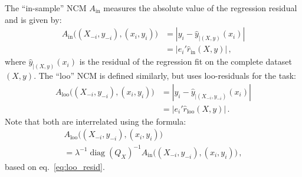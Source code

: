 \documentclass{ITaSconf}
\newcommand{\diag}{\mathop{\text{diag}}\nolimits}
\begin{document}
The ``in-sample'' NCM $A_{\text{in}}$ measures the absolute value of the regression
residual and is given by:
\begin{align}
  A_{\text{in}}\bigl((X_{-i}, y_{-i}), (x_i, y_i)\bigr)
    &= |y_i - \hat{y}_{|(X, y)}(x_i)| \nonumber\\
    &= |e_i' \hat{r}_{\text{in}}(X, y)| \label{eq:ins_ncm}
    \,,
\end{align}
where $\hat{y}_{|(X, y)}(x_i)$ is the residual of the regression fit on the complete
dataset $(X, y)$. The ``loo'' NCM is defined similarly, but uses loo-residuals for
the task:
\begin{align*}
  A_{\text{loo}}\bigl((X_{-i}, y_{-i}), (x_i, y_i)\bigr)
    &= |y_i - \hat{y}_{|(X_{-i}, y_{-i})}(x_i)| \\
    &= |e_i' \hat{r}_{\text{loo}}(X, y)|
    \,.
\end{align*}
Note that both are interrelated using the formula:
\begin{multline*}
  A_{\text{loo}}\bigl((X_{-i}, y_{-i}), (x_i, y_i)\bigr)
    \\ = \lambda^{-1} \diag(Q_X)^{-1}
    A_{\text{in}}\bigl((X_{-i}, y_{-i}), (x_i, y_i)\bigr)
    \,,
\end{multline*}
based on eq.~\ref{eq:loo_resid}.
\end{document}

